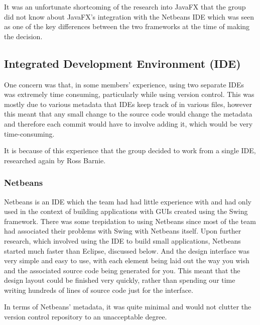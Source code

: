 It was an unfortunate shortcoming of the research into JavaFX that the
group did not know about JavaFX's integration with the Netbeans IDE
which was seen as one of the key differences between the two
frameworks at the time of making the decision.


\subsection{Integrated Development Environment (IDE)}
\label{impl:ui:ide}

One concern was that, in some members' experience, using two separate
IDEs was extremely time consuming, particularly while using version
control.
This was mostly due to various metadata that IDEs keep track of in
various files, however this meant that any small change to the source
code would change the metadata and therefore each commit would have to
involve adding it, which would be very time-consuming.

It is because of this experience that the group decided to work from a
single IDE, researched again by Ross Barnie.

\subsubsection{Netbeans}
\label{impl:ui:ide:netbeans}

Netbeans is an IDE which the team had had little experience with and had
only used in the context of building applications with GUIs created
using the Swing framework.
There was some trepidation to using Netbeans since most of the team
had associated their problems with Swing with Netbeans itself.
Upon further research, which involved using the IDE to build small
applications, Netbeans started much faster than Eclipse, discussed
below.
And the design interface was very simple and easy to use, with each
element being laid out the way you wish and the associated source code
being generated for you.
This meant that the design layout could be finished very quickly,
rather than spending our time writing hundreds of lines of source code
just for the interface.

In terms of Netbeans' metadata, it was quite minimal and would not
clutter the version control repository to an unacceptable degree.

